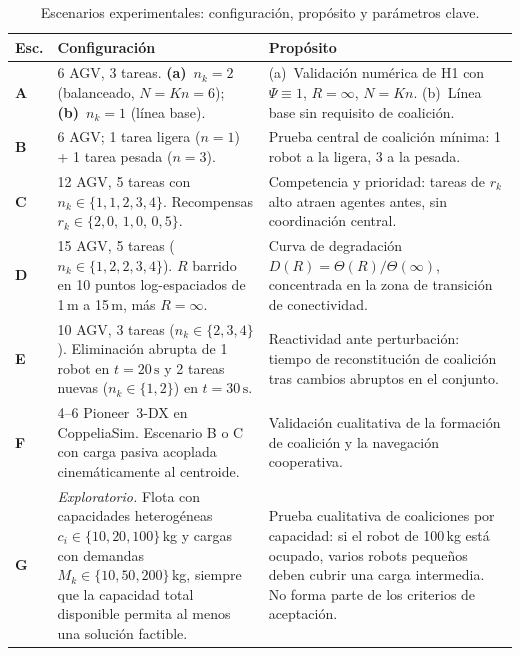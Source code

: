 \begin{table}[htbp]
\centering
\small
\renewcommand{\arraystretch}{1.35}
\caption[Escenarios experimentales]%
{Escenarios experimentales: configuración, propósito y parámetros clave.}
\label{tab:escenarios}
\begin{tabularx}{\textwidth}{@{}>{\bfseries\sffamily\color{VIUOrange}}p{} p{} Y@{}}
\toprule
\normalfont\bfseries\color{VIUDark}Esc. &
  \bfseries Configuración &
  \bfseries Propósito \\
\midrule
A &
  6 AGV, 3 tareas. \textbf{(a)}~$n_k = 2$ (balanceado, $N=Kn=6$);
  \textbf{(b)}~$n_k = 1$ (línea base). &
  (a)~Validación numérica de H1 con $\Psi\equiv 1$, $R=\infty$, $N=Kn$.
  (b)~Línea base sin requisito de coalición. \\
\addlinespace[2pt]
B &
  6 AGV; 1 tarea ligera ($n=1$) + 1 tarea pesada ($n=3$). &
  Prueba central de coalición mínima: 1 robot a la ligera, 3 a la pesada. \\
\addlinespace[2pt]
C &
  12 AGV, 5 tareas con $n_k \in \{1,1,2,3,4\}$. Recompensas
  $r_k \in \{2{,}0,\, 1{,}0,\, 0{,}5\}$. &
  Competencia y prioridad: tareas de $r_k$ alto atraen agentes antes,
  sin coordinación central. \\
\addlinespace[2pt]
D &
  15 AGV, 5 tareas ($n_k \in \{1,2,2,3,4\}$). $R$ barrido en 10 puntos
  log-espaciados de 1\,m a 15\,m, más $R=\infty$. &
  Curva de degradación $D(R) = \Theta(R)/\Theta(\infty)$, concentrada
  en la zona de transición de conectividad. \\
\addlinespace[2pt]
E &
  10 AGV, 3 tareas ($n_k \in \{2,3,4\}$). Eliminación abrupta de 1 robot
  en $t=20\,\text{s}$ y 2 tareas nuevas ($n_k \in \{1,2\}$) en $t=30\,\text{s}$. &
  Reactividad ante perturbación: tiempo de reconstitución de coalición tras
  cambios abruptos en el conjunto. \\
\addlinespace[2pt]
F &
  4--6 Pioneer~3-DX en CoppeliaSim. Escenario B o C con carga pasiva
  acoplada cinemáticamente al centroide. &
  Validación cualitativa de la formación de coalición y la navegación
  cooperativa. \\
\addlinespace[2pt]
G &
  \emph{Exploratorio.} Flota con capacidades heterogéneas
  $c_i \in \{10,20,100\}$\,kg y cargas con demandas
  $M_k \in \{10,50,200\}$\,kg, siempre que la capacidad total disponible permita al
  menos una solución factible. &
  Prueba cualitativa de coaliciones por capacidad: si el robot de 100\,kg está ocupado,
  varios robots pequeños deben cubrir una carga intermedia. No forma parte de los
  criterios de aceptación. \\
\bottomrule
\end{tabularx}
\end{table}

